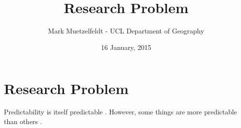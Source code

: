 \documentclass[pdftex,12pt,a4paper]{article}
\title{Research Problem}
\author{Mark Muetzelfeldt - UCL Department of Geography}
\date{16 January, 2015}
\newcommand{\ts}{\textsuperscript}
\begin{document}
\section*{Research Problem}

Predictability is itself predictable \parencite{palmer2004development}. However, some things are
more predictable than others \parencite{delsole2005predictability}. 

\printbibliography[title={References}]
\end{document}
